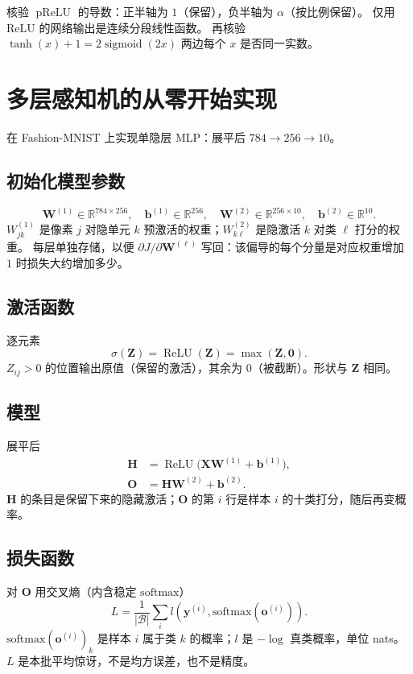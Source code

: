 核验 $\operatorname{pReLU}$ 的导数：正半轴为 $1$（保留），负半轴为 $\alpha$（按比例保留）。
仅用 ReLU 的网络输出是连续分段线性函数。
再核验 $\operatorname{tanh}(x)+1=2\operatorname{sigmoid}(2x)$ 两边每个 $x$ 是否同一实数。

\section{多层感知机的从零开始实现}

在 Fashion-MNIST 上实现单隐层 MLP：展平后 $784\to 256\to 10$。

\subsection{初始化模型参数}

\[
\bm{W}^{(1)}\in\mathbb{R}^{784\times 256},\quad
\bm{b}^{(1)}\in\mathbb{R}^{256},\quad
\bm{W}^{(2)}\in\mathbb{R}^{256\times 10},\quad
\bm{b}^{(2)}\in\mathbb{R}^{10}.
\]
$W^{(1)}_{jk}$ 是像素 $j$ 对隐单元 $k$ 预激活的权重；$W^{(2)}_{k\ell}$ 是隐激活 $k$ 对类 $\ell$ 打分的权重。
每层单独存储，以便 $\partial J/\partial\bm{W}^{(\ell)}$ 写回：该偏导的每个分量是对应权重增加 $1$ 时损失大约增加多少。

\subsection{激活函数}

逐元素
\[
\sigma(\bm{Z})=\operatorname{ReLU}(\bm{Z})=\max(\bm{Z},\bm{0}).
\]
$Z_{ij}>0$ 的位置输出原值（保留的激活），其余为 $0$（被截断）。形状与 $\bm{Z}$ 相同。

\subsection{模型}

展平后
\begin{align*}
\bm{H}&=\operatorname{ReLU}\bigl(\bm{X}\bm{W}^{(1)}+\bm{b}^{(1)}\bigr),\\
\bm{O}&=\bm{H}\bm{W}^{(2)}+\bm{b}^{(2)}.
\end{align*}
$\bm{H}$ 的条目是保留下来的隐藏激活；$\bm{O}$ 的第 $i$ 行是样本 $i$ 的十类打分，随后再变概率。

\subsection{损失函数}

对 $\bm{O}$ 用交叉熵（内含稳定 $\mathrm{softmax}$）
\[
L=\frac{1}{|\mathcal{B}|}\sum_{i}l(\bm{y}^{(i)},\mathrm{softmax}(\bm{o}^{(i)})).
\]
$\mathrm{softmax}(\bm{o}^{(i)})_k$ 是样本 $i$ 属于类 $k$ 的概率；$l$ 是 $-\log$ 真类概率，单位 nats。
$L$ 是本批平均惊讶，不是均方误差，也不是精度。

